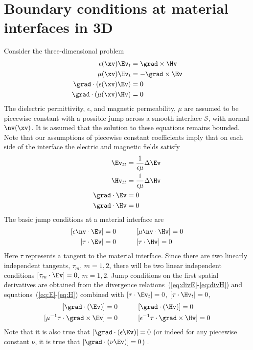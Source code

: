 \section{Boundary conditions at material interfaces in 3D}
Consider the three-dimensional problem 
\begin{align}
  \epsilon(\xv) \Ev_t & = \curl \Hv \label{eq:E} \\
  \mu(\xv) \Hv_t &= -\curl \Ev \label{eq:H} \\
  \Div(\epsilon(\xv) \Ev) &=0 \label{eq:divE} \\
  \Div(\mu(\xv) \Hv) &=0 \label{eq:divH}
\end{align}
The dielectric permittivity, $\epsilon$, and magnetic permeability, $\mu$ are
assumed to be piecewise constant with a possible jump across a smooth interface ${\mathcal S}$,
with normal $\nv(\xv)$.
It is assumed that the solution to these equations remains bounded.
Note that our assumptions of piecewise constant coefficients
imply that on each side of the interface the electric and magnetic fields
satisfy
\begin{align}
  \Ev_{tt} & = {1\over\epsilon\mu}\Delta\Ev \label{eq:Ett} \\
  \Hv_{tt} & = {1\over\epsilon\mu}\Delta\Hv \label{eq:Htt}  \\
  \Div\Ev &=0 \label{eq:divE2}  \\
  \Div\Hv &=0 \label{eq:divH2}
\end{align}
% 
The basic jump conditions at a material interface are 
\begin{alignat}{3}
  [ \epsilon \nv\cdot\Ev] & =0 &\qquad& [\mu \nv\cdot\Hv] =0   \label{eq:jumpN0}\\
  [ \tau\cdot \Ev] &=0         &\qquad& [ \tau\cdot\Hv ] =0    \label{eq:jumpT0}
\end{alignat}
Here $\tau$ represents a tangent to the material interface. Since there are two linearly independent
tangents, $\tau_m$, $m=1,2$, there will be two linear independent conditions
$[\tau_m\cdot \Ev]=0$, $m=1,2$.
% 
Jump conditions on the first spatial 
derivatives are obtained from the divergence relations~(\ref{eq:divE}-\ref{eq:divH})
and equations~(\ref{eq:E}-\ref{eq:H}) combined with $[\tau\cdot \Ev_t] =0$, $[\tau\cdot\Hv_t]=0$,
\begin{alignat}{3}
  [ \Div(\Ev)] & =0               &\qquad& [\Div(\Hv)] =0  \\
  [ \mu^{-1}\tau\cdot\curl\Ev] &=0    &\qquad& [ \epsilon^{-1}\tau\cdot\curl\Hv ] =0
\end{alignat}
Note that it is also true that $[ \Div(\epsilon \Ev)] =0$ (or indeed for any piecewise constant 
$\nu$, it is true that $[ \Div(\nu \Ev)] =0$) .

